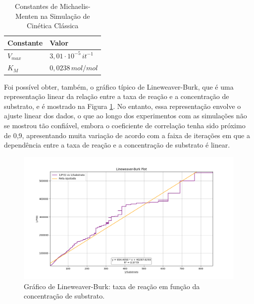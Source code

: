 \documentclass[12pt,oneside]{report}
\begin{document}
\begin{table}[H]
    \centering
    \caption{Constantes de Michaelis-Menten na Simulação de Cinética Clássica}
    \vspace{0.2cm}
    \begin{tabularx}{\textwidth}{X m{5cm}}
        \hline
        \textbf{Constante} & \textbf{Valor}                    \\
        \hline
        $V_{max}$          & $3{,}01 \cdot 10^{-5} \, it^{-1}$ \\
        $K_M$              & $0{,}0238 \, mol/mol$             \\
        \hline
    \end{tabularx}
    \vspace{0.2cm}
    \label{tab:params_MM}
\end{table}

Foi possível obter, também, o gráfico típico de Lineweaver-Burk, que é uma representação linear da relação entre a taxa de reação e a concentração de substrato, e é mostrado na Figura \ref{fig:MM_lineweaver_burk}. No entanto, essa representação envolve o ajuste linear dos dados, o que ao longo dos experimentos com as simulações não se mostrou tão confiável, embora o coeficiente de correlação tenha sido próximo de 0{,}9, apresentando muita variação de acordo com a faixa de iterações em que a dependência entre a taxa de reação e a concentração de substrato é linear.

\begin{figure}[H]
    \centering
    \includegraphics[width=1\textwidth]{img/lineweaver_burk_plot.png}
    \caption{\small Gráfico de Lineweaver-Burk: taxa de reação em função da concentração de substrato.}
    \label{fig:MM_lineweaver_burk}
\end{figure}
\end{document}
